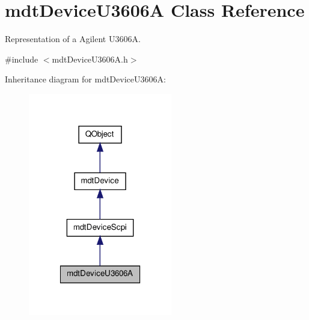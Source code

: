 \hypertarget{classmdt_device_u3606_a}{\section{mdt\-Device\-U3606\-A Class Reference}
\label{classmdt_device_u3606_a}
}


Representation of a Agilent U3606\-A.  




{\ttfamily \#include $<$mdt\-Device\-U3606\-A.\-h$>$}



Inheritance diagram for mdt\-Device\-U3606\-A\-:\nopagebreak
\begin{figure}[H]
\begin{center}
\leavevmode
\includegraphics[width=178pt]{classmdt_device_u3606_a__inherit__graph}
\end{center}
\end{figure}


